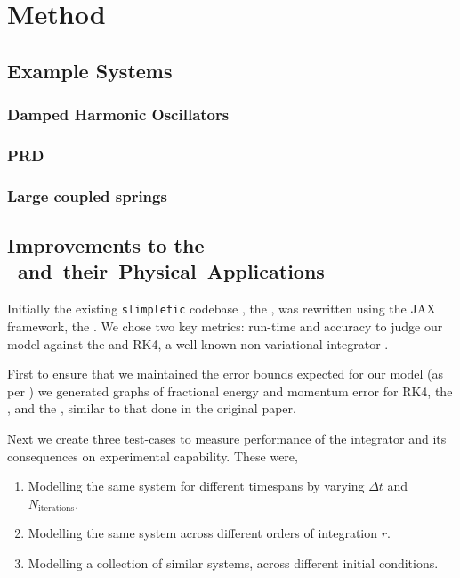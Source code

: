 \section{Method}

\subsection{Example Systems}

\subsubsection{Damped Harmonic Oscillators}

\subsubsection{PRD}

\subsubsection{Large coupled springs}

\subsection{Improvements to the \SI{} and their Physical Applications}

Initially the existing \texttt{slimpletic} codebase \cite{originalCode}, the \orgimpl{}, was rewritten using the JAX framework, the \updimpl{}. We chose two key metrics: run-time and accuracy to judge our model against the \orgimpl{} and RK4, a well known non-variational integrator . 

First to ensure that we maintained the error bounds expected for our model (as per ) we generated graphs of fractional energy and momentum error for RK4, the \orgimpl{}, and the \updimpl{}, similar to that done in the original paper.

Next we create three test-cases to measure performance of the
integrator and its consequences on experimental capability. These were,

\begin{enumerate}
	\item Modelling the same system for different timespans by varying $\Delta t$ and $N_{\text{iterations}}$.
	\item Modelling the same system across different orders of integration $r$.
	\item Modelling a collection of similar systems, across different initial conditions.
\end{enumerate}

